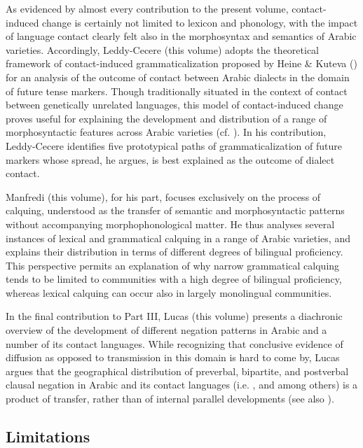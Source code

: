 \documentclass[output=paper]{langsci/langscibook}
\begin{document}
As evidenced by almost every contribution to the present volume, contact-induced change is certainly not limited to lexicon and phonology, with the impact of language contact clearly felt also in the morphosyntax and semantics of Arabic varieties. Accordingly, Leddy-Cecere (this volume) adopts the theoretical framework of contact-induced grammaticalization proposed by Heine \& Kuteva (\citeyear{HeineKuteva2003,HeineKuteva2005}) for an analysis of the outcome of contact between Arabic dialects in the domain of future tense markers. Though traditionally situated in the context of contact between genetically unrelated languages, this model of contact-induced change proves useful for explaining the development and distribution of a range of morphosyntactic features across Arabic varieties (cf. \citealt{Leddy-Cecere2018}). In his contribution, Leddy-Cecere identifies five prototypical paths of grammaticalization of future markers whose spread, he argues, is best explained as the outcome of dialect contact.

Manfredi (this volume), for his part, focuses exclusively on the process of calquing, understood as the transfer of semantic and morphosyntactic patterns without accompanying morphophonological matter. He thus analyses several instances of lexical and grammatical calquing in a range of Arabic varieties, and explains their distribution in terms of different degrees of bilingual proficiency. This perspective permits an explanation of why narrow grammatical calquing tends to be limited to communities with a high degree of bilingual proficiency, whereas lexical calquing can occur also in largely monolingual communities.

In the final contribution to Part III, Lucas (this volume) presents a diachronic overview of the development of different negation patterns in Arabic and a number of its contact languages. While recognizing that conclusive evidence of diffusion as opposed to transmission in this domain is hard to come by, Lucas argues that the geographical distribution of preverbal, bipartite, and postverbal clausal negation in Arabic and its contact languages (i.e. ,  and  among others) is a product of transfer, rather than of internal parallel developments (see also \citealt{LucasLash2010}). 


\subsection{Limitations}\label{introlimitations}
\end{document}
